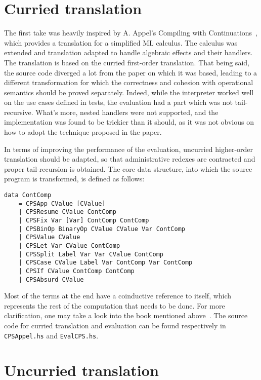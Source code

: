 \documentclass[declaration,shortabstract]{iithesis}
\theoremstyle{definition} \newtheorem{definition}{Definition}[chapter]
\theoremstyle{remark} \newtheorem{remark}[definition]{Observation}
\theoremstyle{plain} \newtheorem{theorem}[definition]{Theorem}
\theoremstyle{plain} \newtheorem{lemma}[definition]{Lemma}
\begin{document}
    \section{Curried translation}

    The first take was heavily inspired by A. Appel's Compiling with
    Continuations~\cite{appel-continuations}, which provides a translation for
    a simplified ML calculus. The calculus was extended and translation adapted to
    handle algebraic effects and their handlers. The translation is based on the curried
    first-order translation. That being said, the source code diverged a lot from the
    paper on which it was based, leading to a different transformation for which the
    correctness and cohesion with operational semantics should be proved separately.
    Indeed, while the interpreter worked well on the use cases defined in tests, the
    evaluation had a part which was not tail-recursive. What's more, nested handlers
    were not supported, and the implementation was found to be trickier than it should,
    as it was not obvious on how to adopt the technique proposed in the paper.

    In terms of improving the performance of the evaluation, uncurried higher-order
    translation should be adapted, so that administrative redexes are contracted
    and proper tail-recursion is obtained. The core data structure, into which the
    source program is transformed, is defined as follows:

    \begin{verbatim}
data ContComp
    = CPSApp CValue [CValue]
    | CPSResume CValue ContComp
    | CPSFix Var [Var] ContComp ContComp
    | CPSBinOp BinaryOp CValue CValue Var ContComp
    | CPSValue CValue
    | CPSLet Var CValue ContComp
    | CPSSplit Label Var Var CValue ContComp
    | CPSCase CValue Label Var ContComp Var ContComp
    | CPSIf CValue ContComp ContComp
    | CPSAbsurd CValue
    \end{verbatim}
    Most of the terms at the end have a coinductive reference to itself, which
    represents the rest of the computation that needs to be done. For more
    clarification, one may take a look into the book mentioned
    above~\cite{appel-continuations}. The source code for curried translation and
    evaluation can be found respectively in \verb!CPSAppel.hs! and
    \verb!EvalCPS.hs!.

    \section{Uncurried translation}
\end{document}
